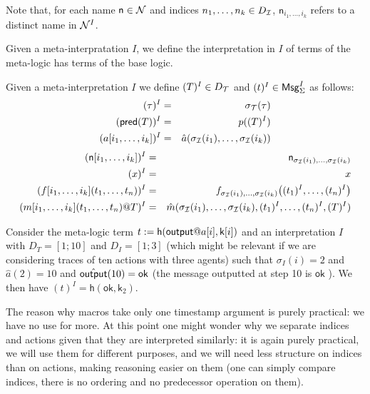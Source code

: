 Note that, for each name $\mathsf{n}\in \mathcal{N}$ and indices $n_1,\ldots,n_k \in
D_{\mathcal{I}}$, $\mathsf{n}_{i_1,\ldots,i_k}$ refers to a distinct name in $\mathcal{N}^I$.

Given a meta-interpratation $I$, we define the interpretation in $I$ of terms of the meta-logic has terms of the base logic.
\begin{definition}
  Given a meta-interpretation $I$
  we define $(T)^{I} \in D_{\mathcal{T}}$ and $(t)^{I} \in \mathsf{Msg}^I_\Sigma$ as follows:
  \begin{eqnarray*}
    (\tau)^{I} &=& \sigma_{\mathcal{T}}(\tau) \\
    (\textsf{pred}(T))^{I} &=& p((T)^{I}) \\
    (a[i_1,\ldots,i_k])^{I} &=& \hat{a}(\sigma_{\mathcal{I}}(i_1),\ldots,\sigma_{\mathcal{I}}(i_k))
  \end{eqnarray*}
  \begin{eqnarray*}
    (\mathsf{n}[i_1,\ldots,i_k])^{I} &=& \mathsf{n}_{\sigma_{\mathcal{I}}(i_1),\ldots,\sigma_{\mathcal{I}}(i_k)}
    \\
    (x)^{I} &=& x
    \\
    (f[i_1,\ldots,i_k](t_1,\ldots,t_n))^{I} &=&
    f_{\sigma_{\mathcal{I}}(i_1),\ldots,\sigma_{\mathcal{I}}(i_k)}\bigl(
      (t_1)^{I},\ldots,(t_n)^{I}
    \bigr)
    \\
    (m[i_1,\ldots,i_k](t_1,\ldots,t_n)@T)^{I} &=&
    \hat{m}(\sigma_{\mathcal{I}}(i_1),\ldots,\sigma_{\mathcal{I}}(i_k),
      (t_1)^{I},\ldots,(t_n)^{I},
      (T)^{I})
  \end{eqnarray*}
\end{definition}

\begin{example}
  Consider the meta-logic term $t := \mathsf{h}(\mout@a[i],\mathsf{k}[i])$
  and an interpretation $I$ with $D_T = [1;10]$ and $D_I = [1;3]$
  (which might be relevant if we are considering traces of ten actions
  with three agents) such that $\sigma_I(i)=2$ and $\hat{a}(2)=10$
  and $\hat{\textsf{output}}(10)=\mathsf{ok}$ (the message outputted at step 10
  is $\mathsf{ok}$ ).
  We then have $(t)^I = \mathsf{h}(\mathsf{ok},\mathsf{k}_2)$.
\end{example}

The reason why macros take only one timestamp argument is purely practical:
we have no use for more. At this point one might wonder why we separate
indices and actions given that they are interpreted similarly: it is again
purely practical, we will use them for different purposes, and we will need
less structure on indices than on actions, making reasoning easier on them
(one can simply compare indices, there is no ordering and no predecessor
operation on them).

